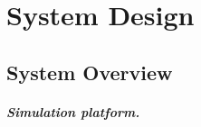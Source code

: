 %

\chapter{System Design}
\label{chap:system_design}


\section{System Overview}
\label{sec:sd_overview}

\paragraph{Simulation platform.}

